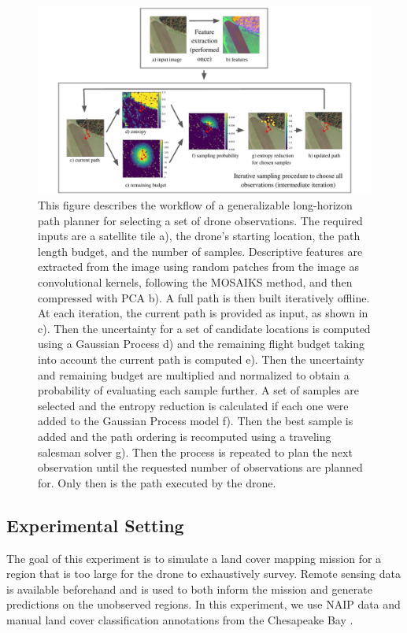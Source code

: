 \begin{figure}
    \centering
    \includegraphics[width=\textwidth, clip, trim={1.5cm, 0, 1.5cm, 0}]{figs/methods/IPP/RAPTORS_concept_figure.pdf}
    \caption{This figure describes the workflow of a generalizable long-horizon path planner for selecting a set of drone observations. The required inputs are a satellite tile a), the drone's starting location, the path length budget, and the number of samples. Descriptive features are extracted from the image using random patches from the image as convolutional kernels, following the MOSAIKS method, and then compressed with PCA b). A full path is then built iteratively offline. At each iteration, the current path is provided as input, as shown in c). Then the uncertainty for a set of candidate locations is computed using a Gaussian Process d) and the remaining flight budget taking into account the current path is computed e). Then the uncertainty and remaining budget are multiplied and normalized to obtain a probability of evaluating each sample further. A set of samples are selected and the entropy reduction is calculated if each one were added to the Gaussian Process model f). Then the best sample is added and the path ordering is recomputed using a traveling salesman solver g). Then the process is repeated to plan the next observation until the requested number of observations are planned for. Only then is the path executed by the drone.
}
    \label{fig:methods:IPP_raptors_overview}
\end{figure}

\subsection{Experimental Setting}
The goal of this experiment is to simulate a land cover mapping mission for a region that is too large for the drone to exhaustively survey. Remote sensing data is available beforehand and is used to both inform the mission and generate predictions on the unobserved regions. In this experiment, we use NAIP data and manual land cover classification annotations from the Chesapeake Bay \cite{Claggett2014ChesapeakeProduction}.

